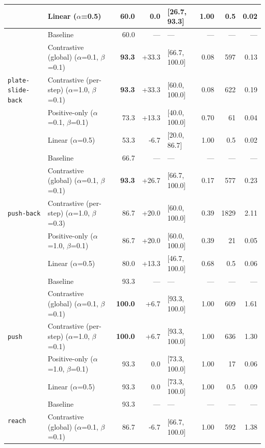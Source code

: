 \begin{table}[p]
{\begin{tabular}{@{}ll r r l r r r@{}}
   & Linear \scriptsize{($\alpha$=0.5)} & 60.0 & 0.0 & [26.7, 93.3] & 1.00 & 0.5 & 0.02 \\
\midrule
  \multirow{5}{*}{\texttt{plate-slide-back}} & Baseline & 60.0 & --- & --- & --- & --- & --- \\
   & Contrastive (global) \scriptsize{($\alpha$=0.1, $\beta$=0.1)} & \textbf{93.3} & +33.3 & [66.7, 100.0] & 0.08 & 597 & 0.13 \\
   & Contrastive (per-step) \scriptsize{($\alpha$=1.0, $\beta$=0.1)} & \textbf{93.3} & +33.3 & [60.0, 100.0] & 0.08 & 622 & 0.19 \\
   & Positive-only \scriptsize{($\alpha$=0.1, $\beta$=0.1)} & 73.3 & +13.3 & [40.0, 100.0] & 0.70 & 61 & 0.04 \\
   & Linear \scriptsize{($\alpha$=0.5)} & 53.3 & -6.7 & [20.0, 86.7] & 1.00 & 0.5 & 0.02 \\
\midrule
  \multirow{5}{*}{\texttt{push-back}} & Baseline & 66.7 & --- & --- & --- & --- & --- \\
   & Contrastive (global) \scriptsize{($\alpha$=0.1, $\beta$=0.1)} & \textbf{93.3} & +26.7 & [66.7, 100.0] & 0.17 & 577 & 0.23 \\
   & Contrastive (per-step) \scriptsize{($\alpha$=1.0, $\beta$=0.3)} & 86.7 & +20.0 & [60.0, 100.0] & 0.39 & 1829 & 2.11 \\
   & Positive-only \scriptsize{($\alpha$=1.0, $\beta$=0.1)} & 86.7 & +20.0 & [60.0, 100.0] & 0.39 & 21 & 0.05 \\
   & Linear \scriptsize{($\alpha$=0.5)} & 80.0 & +13.3 & [46.7, 100.0] & 0.68 & 0.5 & 0.06 \\
\midrule
  \multirow{5}{*}{\texttt{push}} & Baseline & 93.3 & --- & --- & --- & --- & --- \\
   & Contrastive (global) \scriptsize{($\alpha$=0.1, $\beta$=0.1)} & \textbf{100.0} & +6.7 & [93.3, 100.0] & 1.00 & 609 & 1.61 \\
   & Contrastive (per-step) \scriptsize{($\alpha$=1.0, $\beta$=0.1)} & \textbf{100.0} & +6.7 & [93.3, 100.0] & 1.00 & 636 & 1.30 \\
   & Positive-only \scriptsize{($\alpha$=1.0, $\beta$=0.1)} & 93.3 & 0.0 & [73.3, 100.0] & 1.00 & 17 & 0.06 \\
   & Linear \scriptsize{($\alpha$=0.5)} & 93.3 & 0.0 & [73.3, 100.0] & 1.00 & 0.5 & 0.09 \\
\midrule
  \multirow{5}{*}{\texttt{reach}} & Baseline & 93.3 & --- & --- & --- & --- & --- \\
   & Contrastive (global) \scriptsize{($\alpha$=0.1, $\beta$=0.1)} & 86.7 & -6.7 & [66.7, 100.0] & 1.00 & 592 & 1.38 \\

\end{tabular}}
\end{table}
